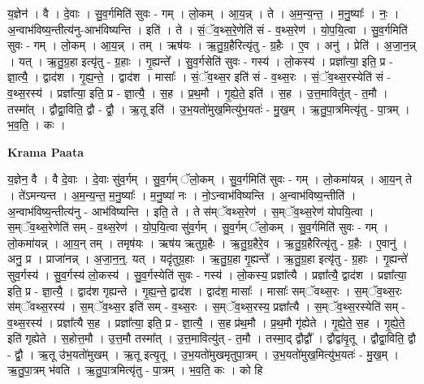 \documentclass[17pt]{extarticle}
\begin{document}
य॒ज्ञेन॑ । वै । दे॒वाः । सु॒व॒र्गमिति॑ सुवः - गम् । लो॒कम् । आ॒य॒न्न् । ते । अ॒म॒न्य॒न्त॒ । म॒नु॒ष्याः᳚ । नः॒ । अ॒न्वाभ॑विष्य॒न्तीत्य॑नु-आभ॑विष्यन्ति । इति॑ । ते । सं॒ॅव॒थ्स॒रे॒णेति॑ सं - व॒थ्स॒रेण॑ । यो॒प॒यि॒त्वा । सु॒व॒र्गमिति॑ सुवः - गम् । लो॒कम् । आ॒य॒न्न् । तम् । ऋष॑यः । ऋ॒तु॒ग्र॒हैरित्यृ॑तु - ग्र॒हैः । ए॒व । अनु॑ । प्रेति॑ । अ॒जा॒न॒न्न् । यत् । ऋ॒तु॒ग्र॒हा इत्यृ॑तु - ग्र॒हाः । गृ॒ह्यन्ते᳚ । सु॒व॒र्गसेति॑ सुवः - गस्य॑ । लो॒कस्य॑ । प्रज्ञा᳚त्या॒ इति॒ प्र - ज्ञा॒त्यै॒ । द्वाद॑श । गृ॒ह्य॒न्ते॒ । द्वाद॑श । मासाः᳚ । सं॒ॅव॒थ्स॒र इति॑ सं - व॒थ्स॒रः । सं॒ॅव॒थ्स॒रस्येति॑ सं - व॒थ्स॒रस्य॑ । प्रज्ञा᳚त्या॒ इति॒ प्र - ज्ञा॒त्यै॒ । स॒ह । प्र॒थ॒मौ । गृ॒ह्ये॒ते॒ इति॑ । स॒ह । उ॒त्त॒मावितु॑त् - त॒मौ । तस्मा᳚त् । द्वौद्वा॒विति॒ द्वौ - द्वौ॒ । ऋ॒तू इति॑ । उ॒भ॒यतो॑मुख॒मित्यु॑भ॒यतः॑ - मु॒ख॒म् । ऋ॒तु॒पा॒त्रमित्यृ॑तु - पा॒त्रम् । भ॒व॒ति॒ । कः ।  \newline


\textbf{Krama Paata} \newline

य॒ज्ञेन॒ वै । वै दे॒वाः । दे॒वाः सु॑व॒र्गम् । सु॒व॒र्गम् ॅलो॒कम् । सु॒व॒र्गमिति॑ सुवः - गम् । लो॒कमा॑यन्न् । आ॒य॒न् ते । ते॑ऽमन्यन्त । अ॒म॒न्य॒न्त॒ म॒नु॒ष्याः᳚ । म॒नु॒ष्या॑ नः । नो॒ऽन्वाभ॑विष्यन्ति । अ॒न्वाभ॑विष्य॒न्तीति॑ । अ॒न्वाभ॑विष्य॒न्तीत्य॑नु - आभ॑विष्यन्ति । इति॒ ते । ते स॑म्ॅवथ्स॒रेण॑ । स॒म्ॅव॒थ्स॒रेण॑ योपयि॒त्वा । स॒म्ॅव॒थ्स॒रेणेति॑ सम् - व॒थ्स॒रेण॑ । यो॒प॒यि॒त्वा सु॑व॒र्गम् । सु॒व॒र्गम् ॅलो॒कम् । सु॒व॒र्गमिति॑ सुवः - गम् । लो॒कमा॑यन्न् । आ॒य॒न् तम् । तमृष॑यः । ऋष॑य ऋतुग्र॒हैः । ऋ॒तु॒ग्र॒हैरे॒व । ऋ॒तु॒ग्र॒हैरित्यृ॑तु - ग्र॒हैः । ए॒वानु॑ । अनु॒ प्र । प्राजा॑नन्न् । अ॒जा॒न॒न्॒. यत् । यदृ॑तुग्र॒हाः । ऋ॒तु॒ग्र॒हा गृ॒ह्यन्ते᳚ । ऋ॒तु॒ग्र॒हा इत्यृ॑तु - ग्र॒हाः । गृ॒ह्यन्ते॑ सुव॒र्गस्य॑ । सु॒व॒र्गस्य॑ लो॒कस्य॑ । सु॒व॒र्गस्येति॑ सुवः - गस्य॑ । लो॒कस्य॒ प्रज्ञा᳚त्यै । प्रज्ञा᳚त्यै॒ द्वाद॑श । प्रज्ञा᳚त्या॒ इति॒ प्र - ज्ञा॒त्यै॒ । द्वाद॑श गृह्यन्ते । गृ॒ह्य॒न्ते॒ द्वाद॑श । द्वाद॑श॒ मासाः᳚ । मासाः᳚ सम्ॅवथ्स॒रः । स॒म्ॅव॒थ्स॒रः स॑म्ॅवथ्स॒रस्य॑ । स॒म्ॅव॒थ्स॒र इति॑ सम् - व॒थ्स॒रः । स॒म्ॅव॒थ्स॒रस्य॒ प्रज्ञा᳚त्यै । स॒म्ॅव॒थ्स॒रस्येति॑ सम् - व॒थ्स॒रस्य॑ । प्रज्ञा᳚त्यै स॒ह । प्रज्ञा᳚त्या॒ इति॒ प्र - ज्ञा॒त्यै॒ । स॒ह प्र॑थ॒मौ । प्र॒थ॒मौ गृ॑ह्येते । गृ॒ह्ये॒ते॒ स॒ह । गृ॒ह्ये॒ते॒ इति॑ गृह्येते । स॒होत्त॒मौ । उ॒त्त॒मौ तस्मा᳚त् । उ॒त्त॒मावित्यु॑त् - त॒मौ । तस्मा॒द् द्वौद्वौ᳚ । द्वौद्वा॑वृ॒तू । द्वौद्वा॒विति॒ द्वौ - द्वौ॒ । ऋ॒तू उ॑भ॒यतो॑मुखम् । ऋ॒तू इत्यृ॒तू । उ॒भ॒यतो॑मुखमृतुपा॒त्रम् । उ॒भ॒यतो॑मुख॒मित्यु॑भ॒यतः॑ - मु॒ख॒म् । ऋ॒तु॒पा॒त्रम् भ॑वति । ऋ॒तु॒पा॒त्रमित्यृ॑तु - पा॒त्रम् । भ॒व॒ति॒ कः । को हि \newline
\end{document}
